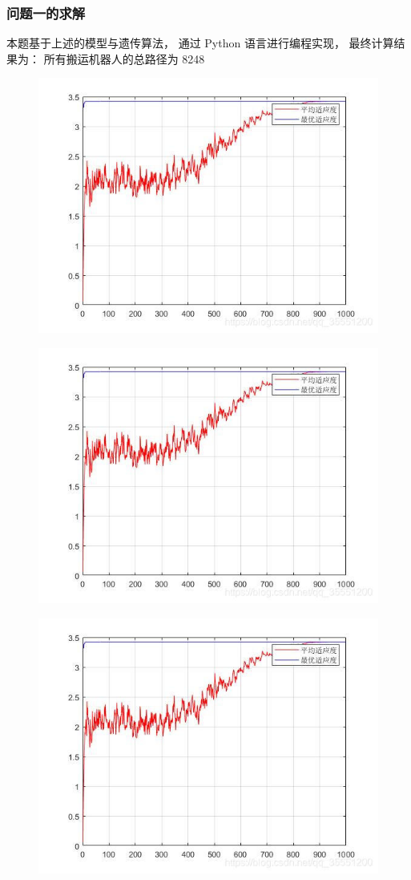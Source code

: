 \documentclass{article}
\begin{document}
	\subsubsection{问题一的求解}
本题基于上述的模型与遗传算法， 通过 Python 语言进行编程实现， 最终计算结果为： 所有搬运机器人的总路径为 8248
\begin{figure}

	\includegraphics[width=0.50\linewidth]{Solution1.jpg}
	\caption{\label{}}
\end{figure}
\begin{figure}

	\includegraphics[width=0.50\linewidth]{Solution1.jpg}
	\caption{\label{}}
\end{figure}
	\begin{figure}
		\centering
		\includegraphics[width=0.50\linewidth]{Solution1.jpg}
		\caption{\label{}}
	\end{figure}
	
\end{document}

